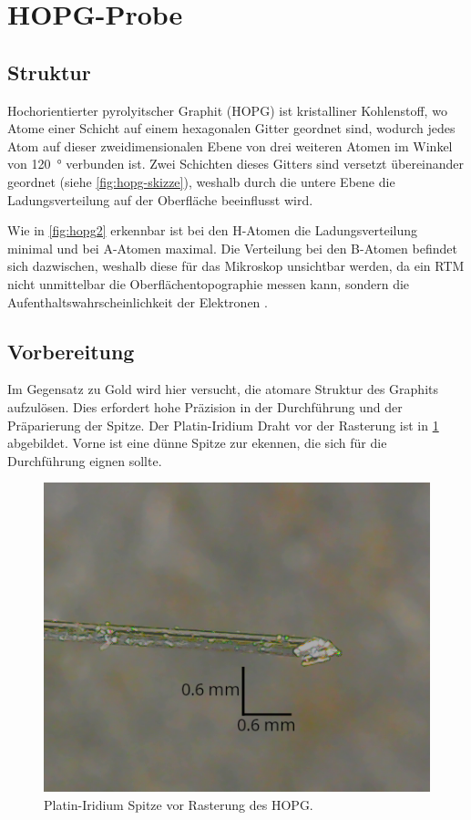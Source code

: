 \section{HOPG-Probe}\label{sec:hopg-probe}
\subsection*{Struktur}
Hochorientierter pyrolyitscher Graphit (HOPG) ist kristalliner Kohlenstoff, wo Atome einer Schicht
auf einem hexagonalen Gitter geordnet sind, wodurch jedes Atom auf dieser zweidimensionalen
Ebene von drei weiteren Atomen im Winkel von \SI{120}{\degree} verbunden ist. Zwei Schichten
dieses Gitters sind versetzt übereinander geordnet (siehe \cref{fig:hopg-skizze}), weshalb durch die
untere Ebene die Ladungsverteilung auf der Oberfläche beeinflusst wird.\par Wie in
\cref{fig:hopg2} erkennbar ist bei den H-Atomen die Ladungsverteilung minimal und bei A-Atomen maximal.
Die Verteilung bei den B-Atomen befindet sich dazwischen, weshalb diese für das Mikroskop unsichtbar werden,
da ein RTM nicht unmittelbar die Oberflächentopographie messen kann, sondern die Aufenthaltswahrscheinlichkeit der
Elektronen \cite{rtm-leitpfaden}.



\subsection*{Vorbereitung}
Im Gegensatz zu Gold wird hier versucht, die atomare Struktur des Graphits aufzulösen.
Dies erfordert hohe Präzision in der Durchführung und der Präparierung der Spitze. Der Platin-Iridium Draht
vor der Rasterung ist in \cref{fig:spitze_hopg_vorher_v2} abgebildet. Vorne ist eine dünne Spitze zur ekennen,
die sich für die Durchführung eignen sollte.

\begin{figure}[htb]
	\centering
	\includegraphics[width=0.5\linewidth]{figs/spitze_hopg_vorher_v2.png}
	\caption{Platin-Iridium Spitze vor Rasterung des HOPG.}
	\label{fig:spitze_hopg_vorher_v2}
\end{figure}

